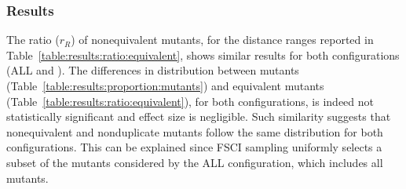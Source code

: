 




\subsubsection{Results}


The ratio ($r_R$) of nonequivalent mutants, for the distance ranges reported in Table~\ref{table:results:ratio:equivalent}, shows
similar results for both configurations (ALL and \APPR). 
The differences in distribution between mutants (Table~\ref{table:results:proportion:mutants}) and equivalent mutants  (Table~\ref{table:results:ratio:equivalent}), for both  configurations, is indeed not statistically significant and effect size is negligible.
Such similarity suggests that nonequivalent and nonduplicate mutants follow the same distribution for both configurations. This can be explained since 
FSCI sampling uniformly selects 
a subset of the mutants considered by the ALL configuration, which includes all mutants. 



